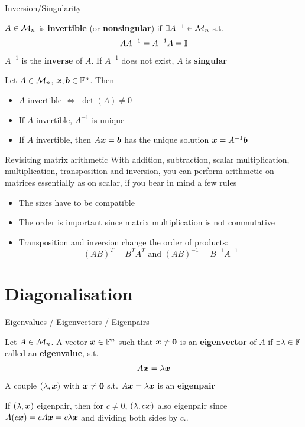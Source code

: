 \documentclass[aspectratio=169]{beamer}
\begin{document}
\begin{frame}{Inversion/Singularity}
\begin{definition}
$A\in\mathcal{M}_n$ is \textbf{invertible} (or \textbf{nonsingular}) if $\exists A^{-1}\in\mathcal{M}_n$ s.t.
\[
AA^{-1}=A^{-1}A=\mathbb{I}
\]
$A^{-1}$ is the \textbf{inverse} of $A$. If $A^{-1}$ does not exist, $A$ is \textbf{singular}
\end{definition}
\begin{importanttheorem}
Let $A\in\mathcal{M}_n$, $\bm{x},\bm{b}\in\mathbb{F}^n$. Then
\begin{itemize}
	\item $A$ invertible $\iff$ $\det(A)\neq 0$
	\item If $A$ invertible, $A^{-1}$ is unique
	\item If $A$ invertible, then $A\bm{x}=\bm{b}$ has the unique solution $\bm{x}=A^{-1}\bm{b}$
\end{itemize}
\end{importanttheorem}
\end{frame}

\begin{frame}{Revisiting matrix arithmetic}
With addition, subtraction, scalar multiplication, multiplication, transposition and inversion, you can perform arithmetic on matrices essentially as on scalar, if you bear in mind a few rules
\begin{itemize}
\item The sizes have to be compatible
\item The order is important since matrix multiplication is not commutative
\item Transposition and inversion change the order of products:
\[
(AB)^T=B^TA^T\textrm{ and }(AB)^{-1}=B^{-1}A^{-1}
\]
\end{itemize}
\end{frame}


\section{Diagonalisation}

\begin{frame}{Eigenvalues / Eigenvectors / Eigenpairs}
\begin{definition}
Let $A\in\mathcal{M}_n$. A vector $\bm{x}\in\mathbb{F}^n$ such that $\bx\neq\b0$ is an \textbf{eigenvector} of $A$ if $\exists\lambda\in\mathbb{F}$ called an \textbf{eigenvalue}, s.t.
\[
A\bm{x}=\lambda \bm{x}
\]
A couple $(\lambda,\bm{x})$ with $\bx\neq\b0$ s.t. $A\bm{x}=\lambda\bm{x}$ is an \textbf{eigenpair}
\end{definition}
If $(\lambda,\bm{x})$ eigenpair, then for $c\neq 0$, $(\lambda,c\bm{x})$ also eigenpair since $A(c\bm{x})=cA\bm{x}=c\lambda\bm{x}$ and dividing both sides by $c$..
\end{frame}
\end{document}
